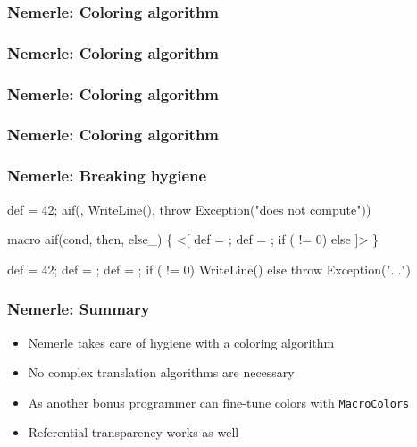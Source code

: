 \documentclass[svgnames,hyperref={bookmarks=false}]{beamer}
\begin{document}
\begin{frame}[fragile]
\frametitle<1>{Nemerle: Coloring algorithm}
\frametitle<2>{Nemerle: Coloring algorithm}%
\frametitle<3>{Nemerle: Coloring algorithm}%
\frametitle<4>{Nemerle: Coloring algorithm}%
\frametitle<5>{Nemerle: Breaking hygiene}%
\begin{semiverbatim}
def  = 42;                 
aif(,
  WriteLine(),
  throw Exception("does not compute"))

macro aif(cond, then, else_) \{      
  <[
    def  = ;
    def  = ;    
    if ( != 0)  else 
  ]>
\}

def  = 42;                 
def  = ;
def  = ;
if ( != 0) WriteLine() else throw Exception("...")
\end{semiverbatim}
\end{frame}

\begin{frame}[fragile]
\frametitle{Nemerle: Summary}
\begin{itemize}
\item Nemerle takes care of hygiene with a coloring algorithm
\item No complex translation algorithms are necessary
\item As another bonus programmer can fine-tune colors with \texttt{MacroColors}
\item Referential transparency works as well
\end{itemize}
\end{frame}
\end{document}

